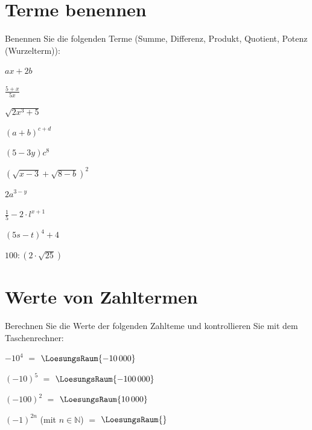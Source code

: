 
\renewcommand{\bbwAufgabenBlockID}{A1Te}

\renewcommand{\metaHeaderLine}{Aufgabenblatt}
\renewcommand{\arbeitsblattTitel}{Algebra: Terme}



\arbeitsblattHeader{}
\section{Terme benennen}
Benennen Sie die folgenden Terme (Summe, Differenz, Produkt, Quotient,
Potenz (Wurzelterm)):

\begin{bbwAufgabenBlock}
\item $ax+2b$ \, 
\item $\frac{5+x}{5x}$ \, 
\item $\sqrt{2x^3+5}$ \, 
\item $(a+b)^{c+d}$ \, 
\item $(5-3y)c^8$ \, 
\item $(\sqrt{x-3}+\sqrt{8-b})^2$ \, 
\item $2a^{3-y}$ \, 
\item $\frac15 - 2\cdot{}l^{x+1}$ \, 
\item $(5s-t)^4+4$ \, 
\item $100:(2\cdot{}\sqrt{25})$ \, 
\end{bbwAufgabenBlock}

\platzFuerBerechnungenBisEndeSeite{}



\section{Werte von Zahltermen}
Berechnen Sie die Werte der folgenden Zahlteme und kontrollieren Sie
mit dem Taschenrechner:

\begin{bbwAufgabenBlock}
\item $-10^4$ $=$ $\LoesungsRaum{-10\,000}$
\item $(-10)^5$ $=$ $\LoesungsRaum{-100\,000}$
\item $(-100)^2$ $=$ $\LoesungsRaum{10\,000}$
\item $(-1)^{2n}$  (mit $n\in\mathbb{N}$)  $=$ $\LoesungsRaum{}$

\end{bbwAufgabenBlock}

